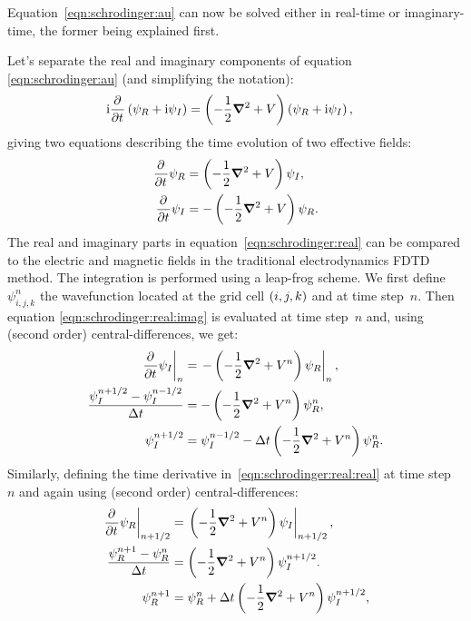 Equation~\eqref{eqn:schrodinger:au} can now be solved either in real-time or
imaginary-time, the former being explained first.

Let's separate the real and imaginary components of equation
\eqref{eqn:schrodinger:au} (and simplifying the notation):
\begin{align}
\textrm{i} \frac{\partial^{{}}   }{\partial t^{{}}} \left(  \psi_R + \textrm{i} \psi_I \right)
    & = \left( -\frac{1}{2} \bm{\nabla}^2 + V  \right)
        \left(  \psi_R + \textrm{i} \psi_I \right),
\end{align}
giving two equations describing the time evolution of two effective fields:
\begin{subequations}
\begin{align}
\frac{\partial^{{}}   }{\partial t^{{}}} \psi_R & =   \left( -\frac{1}{2} \bm{\nabla}^2 + V  \right) \psi_I,
\label{eqn:schrodinger:real:real} \\
\frac{\partial^{{}}   }{\partial t^{{}}} \psi_I & = - \left( -\frac{1}{2} \bm{\nabla}^2 + V  \right) \psi_R.
\label{eqn:schrodinger:real:imag}
\end{align}
\label{eqn:schrodinger:real}
\end{subequations}
The real and imaginary parts in equation~\eqref{eqn:schrodinger:real} can be
compared to the electric and magnetic fields in the traditional electrodynamics
FDTD method. The integration is performed using a leap-frog scheme. We
first define $\psi_{i,j,k}^{n}$ the wavefunction located at the grid cell
$\left( i,j,k \right)$ and at time step~$n$. Then equation
\eqref{eqn:schrodinger:real:imag} is evaluated at time step~$n$ and, using
(second order) central-differences, we get:
\begin{align}
\left. \frac{\partial^{{}}   }{\partial t^{{}}} \psi_I \right|_{n}
& = \left. - \left( -\frac{1}{2} \bm{\nabla}^2 + V^{n}  \right) \psi_R \right|_{n}, \\
\frac{\psi_{I}^{n+1/2} - \psi_{I}^{n-1/2}}{\Delta t}
& = - \left( -\frac{1}{2} \bm{\nabla}^2 + V^{n}  \right) \psi_{R}^{n}, \\
\psi_{I}^{n+1/2}
& = \psi_{I}^{n-1/2} - \Delta t \left( -\frac{1}{2} \bm{\nabla}^2 + V^{n}  \right)
\psi_{R}^{n}.
\label{eqn:schrodinger:real:imag:discretized}
\end{align}
Similarly, defining the time derivative in~\eqref{eqn:schrodinger:real:real} at
time step~$n$ and again using (second order) central-differences:
\begin{align}
\left. \frac{\partial^{{}}   }{\partial t^{{}}} \psi_R \right|_{n+1/2}
& = \left. \left( -\frac{1}{2} \bm{\nabla}^2 + V^{n}  \right) \psi_I \right|_{n+1/2}, \\
\frac{\psi_{R}^{n+1} - \psi_{R}^{n}}{\Delta t}
& = \left( -\frac{1}{2} \bm{\nabla}^2 + V^{n}  \right) \psi_{I}^{n+1/2}. \\
\psi_{R}^{n+1}
& = \psi_{R}^{n} + \Delta t \left( -\frac{1}{2} \bm{\nabla}^2 + V^{n}  \right)
\psi_{I}^{n+1/2},
\label{eqn:schrodinger:real:real:discretized}
\end{align}

